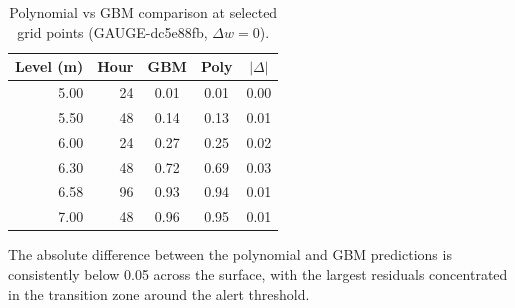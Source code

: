 \begin{table}[H]
    \centering
    \caption{Polynomial vs GBM comparison at selected grid points
             (GAUGE-dc5e88fb, $\Delta w = 0$).}
    \label{tab:poly_vs_gbm}
    \begin{tabular}{rrccc}
        \toprule
        \textbf{Level (m)} & \textbf{Hour} & \textbf{GBM} & \textbf{Poly}
            & \textbf{$|\Delta|$} \\
        \midrule
        5.00 & 24 & 0.01 & 0.01 & 0.00 \\
        5.50 & 48 & 0.14 & 0.13 & 0.01 \\
        6.00 & 24 & 0.27 & 0.25 & 0.02 \\
        6.30 & 48 & 0.72 & 0.69 & 0.03 \\
        6.58 & 96 & 0.93 & 0.94 & 0.01 \\
        7.00 & 48 & 0.96 & 0.95 & 0.01 \\
        \bottomrule
    \end{tabular}
\end{table}

\noindent The absolute difference between the polynomial and GBM predictions
is consistently below 0.05 across the surface, with the largest residuals
concentrated in the transition zone around the alert threshold.
